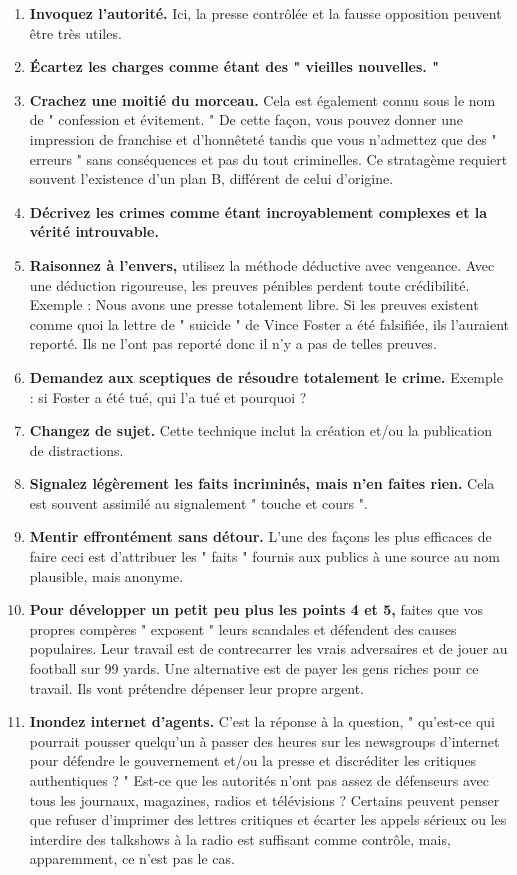 \documentclass[11pt,twoside,a4paper]{article}
\begin{document}
\begin{enumerate}
	\item \textbf{Invoquez l'autorit{\'e}. } Ici, la presse contr{\^o}l{\'e}e et la fausse opposition peuvent {\^e}tre tr{\`e}s utiles.
	\item \textbf{{\'E}cartez les charges comme {\'e}tant des " vieilles nouvelles. " } 
	\item \textbf{Crachez une moiti{\'e} du morceau. } Cela est {\'e}galement connu sous le nom de " confession et {\'e}vitement. " De cette fa\c{c}on, vous pouvez donner une impression de franchise et d'honn{\^e}tet{\'e} tandis que vous n'admettez que des " erreurs " sans cons{\'e}quences et pas du tout criminelles. Ce stratag{\`e}me requiert souvent l'existence d'un plan B, diff{\'e}rent de celui d'origine.
	\item \textbf{D{\'e}crivez les crimes comme {\'e}tant incroyablement complexes et la v{\'e}rit{\'e} introuvable. } 
	\item \textbf{Raisonnez {\`a} l'envers, } utilisez la m{\'e}thode d{\'e}ductive avec vengeance. Avec une d{\'e}duction rigoureuse, les preuves p{\'e}nibles perdent toute cr{\'e}dibilit{\'e}. Exemple : Nous avons une presse totalement libre. Si les preuves existent comme quoi la lettre de " suicide " de Vince Foster a {\'e}t{\'e} falsifi{\'e}e, ils l'auraient report{\'e}. Ils ne l'ont pas report{\'e} donc il n'y a pas de telles preuves.
	\item \textbf{Demandez aux sceptiques de r{\'e}soudre totalement le crime. } Exemple : si Foster a {\'e}t{\'e} tu{\'e}, qui l'a tu{\'e} et pourquoi ?
	\item \textbf{Changez de sujet. } Cette technique inclut la cr{\'e}ation et/ou la publication de distractions.
	\item \textbf{Signalez l{\'e}g{\`e}rement les faits incrimin{\'e}s, mais n'en faites rien. } Cela est souvent assimil{\'e} au signalement " touche et cours ".
	\item \textbf{Mentir effront{\'e}ment sans d{\'e}tour. } L'une des fa\c{c}ons les plus efficaces de faire ceci est d'attribuer les " faits " fournis aux publics {\`a} une source au nom plausible, mais anonyme.
	\item \textbf{Pour d{\'e}velopper un petit peu plus les points 4 et 5, } faites que vos propres comp{\`e}res " exposent " leurs scandales et d{\'e}fendent des causes populaires. Leur travail est de contrecarrer les vrais adversaires et de jouer au football sur 99 yards. Une alternative est de payer les gens riches pour ce travail. Ils vont pr{\'e}tendre d{\'e}penser leur propre argent.
	\item \textbf{Inondez internet d'agents. } C'est la r{\'e}ponse {\`a} la question, " qu'est-ce qui pourrait pousser quelqu'un {\`a} passer des heures sur les newsgroups d'internet pour d{\'e}fendre le gouvernement et/ou la presse et discr{\'e}diter les critiques authentiques ? " Est-ce que les autorit{\'e}s n'ont pas assez de d{\'e}fenseurs avec tous les journaux, magazines, radios et t{\'e}l{\'e}visions ? Certains peuvent penser que refuser d'imprimer des lettres critiques et {\'e}carter les appels s{\'e}rieux ou les interdire des talkshows {\`a} la radio est suffisant comme contr{\^o}le, mais, apparemment, ce n'est pas le cas.
\end{enumerate}
\end{document}
